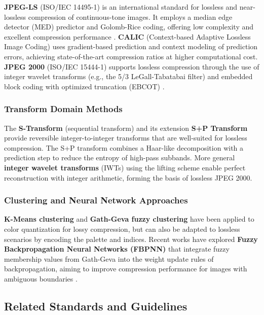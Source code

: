 \textbf{JPEG-LS} (ISO/IEC 14495-1) is an international standard for lossless and near-lossless compression of continuous-tone images. It employs a median edge detector (MED) predictor and Golomb-Rice coding, offering low complexity and excellent compression performance \cite{Weinberger1996}. \textbf{CALIC} (Context-based Adaptive Lossless Image Coding) \cite{Wu1996} uses gradient-based prediction and context modeling of prediction errors, achieving state-of-the-art compression ratios at higher computational cost. \textbf{JPEG 2000} (ISO/IEC 15444-1) supports lossless compression through the use of integer wavelet transforms (e.g., the 5/3 LeGall-Tabatabai filter) and embedded block coding with optimized truncation (EBCOT) \cite{Bhaskaran1995}.

\subsubsection{Transform Domain Methods}

The \textbf{S-Transform} (sequential transform) and its extension \textbf{S+P Transform} \cite{Said1996} provide reversible integer-to-integer transforms that are well-suited for lossless compression. The S+P transform combines a Haar-like decomposition with a prediction step to reduce the entropy of high-pass subbands. More general \textbf{integer wavelet transforms} (IWTs) using the lifting scheme \cite{calderbank1998} enable perfect reconstruction with integer arithmetic, forming the basis of lossless JPEG 2000.

\subsubsection{Clustering and Neural Network Approaches}

\textbf{K-Means clustering} \cite{somasundarad2012} and \textbf{Gath-Geva fuzzy clustering} \cite{hasanzadeh2005} have been applied to color quantization for lossy compression, but can also be adapted to lossless scenarios by encoding the palette and indices. Recent works have explored \textbf{Fuzzy Backpropagation Neural Networks (FBPNN)} that integrate fuzzy membership values from Gath-Geva into the weight update rules of backpropagation, aiming to improve compression performance for images with ambiguous boundaries \cite{sarkar1995}.

\subsection{Related Standards and Guidelines}

